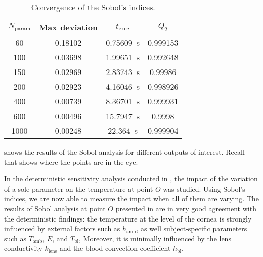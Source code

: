 \begin{table}
    \centering
    \begin{tabular}{cccc}
        \toprule
        $N_\text{param}$ & Max deviation & $t_\text{exec}$ & $Q_2$\\
        \midrule
        60  & 0.18102 & \qty{0.75609}{\second} & 0.999153\\
        100 & 0.03698 & \qty{1.99651}{\second} & 0.992648\\
        150 & 0.02969 & \qty{2.83743}{\second} & 0.99986 \\
        200 & 0.02923 & \qty{4.16046}{\second} & 0.998926\\
        400 & 0.00739 & \qty{8.36701}{\second} & 0.999931\\
        600 & 0.00496 & \qty{15.7947}{\second} & 0.9998  \\
        1000& 0.00248 & \qty{22.364 }{\second} & 0.999904\\
        \bottomrule
    \end{tabular}
    \caption{Convergence of the Sobol's indices.}
    \label{tab:results:SSA:convergence}
\end{table}


 shows the results of the Sobol analysis for different outputs of interest.
Recall that  shows where the points are in the eye.

In the deterministic sensitivity analysis conducted in , the impact of the variation of a sole parameter on the temperature at point $O$ was studied.
Using Sobol's indices, we are now able to measure the impact when all of them are varying.
The results of Sobol analysis at point $O$ presented in  are in very good agreement with the deterministic findings:
the temperature at the level of the cornea is strongly influenced by external factors such as $h_\text{amb}$, as well subject-specific parameters such as $T_\text{amb}$, $E$, and $T_\text{bl}$,
Moreover, it is minimally influenced by the lens conductivity $k_\text{lens}$ and the blood convection coefficient $h_\text{bl}$.

